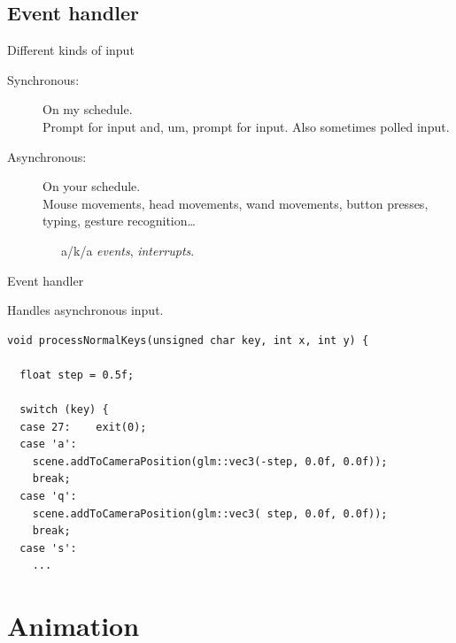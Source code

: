 \documentclass[12pt]{article}
\begin{document}
\subsection{Event handler}

\begin{frame}{Different kinds of input}

\begin{center}
\begin{minipage}{0.75\columnwidth}\raggedright
\begin{description}

\item[Synchronous:] On {\color{red}my} schedule.\\
  Prompt for input and, um, prompt for input.  Also sometimes polled input.


\vspace{20pt}

\item[Asynchronous:] On {\color{red}your} schedule.\\
  Mouse movements, head movements, wand movements,
  button presses, typing, gesture recognition\ldots

\vspace{10pt}
~~~a/k/a \emph{events}, \emph{interrupts}.

\end{description}
\end{minipage}
\end{center}

\end{frame}


\begin{frame}[fragile]{Event handler}

Handles asynchronous input.

\begin{verbatim}
void processNormalKeys(unsigned char key, int x, int y) {

  float step = 0.5f;

  switch (key) {
  case 27:    exit(0);
  case 'a':
    scene.addToCameraPosition(glm::vec3(-step, 0.0f, 0.0f));
    break;
  case 'q':
    scene.addToCameraPosition(glm::vec3( step, 0.0f, 0.0f));
    break;
  case 's':
    ...
\end{verbatim}
\end{frame}


\section{Animation}
\end{document}
